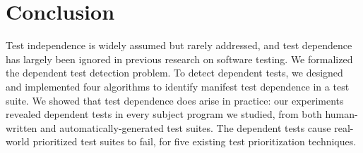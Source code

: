 
\section{Conclusion}
\label{sec:questions}


Test independence is widely assumed but rarely addressed, and
test dependence has largely been ignored in previous
research on software testing. 
We formalized the dependent test detection
problem. To detect dependent tests, we designed
and implemented four algorithms to identify manifest test dependence
in a test suite.
We showed that 
test dependence {does} arise in practice:  our experiments revealed
dependent tests in every subject program
we studied, from both human-written and automatically-generated test
suites.
The dependent tests cause real-world prioritized test suites to fail, for
five existing test prioritization techniques.


